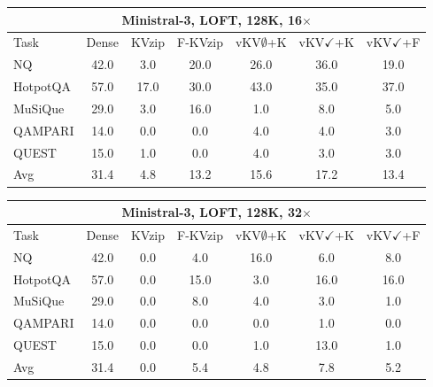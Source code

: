 \begin{tabular}{lcccccc}
\toprule
\multicolumn{7}{c}{Ministral-3, LOFT, 128K, 16$\times$} \\
\midrule
Task & Dense & KVzip & F-KVzip & vKV$\emptyset$+K & vKV$\checkmark$+K & vKV$\checkmark$+F \\
\midrule
NQ & 42.0 & 3.0 & 20.0 & 26.0 & 36.0 & 19.0 \\
HotpotQA & 57.0 & 17.0 & 30.0 & 43.0 & 35.0 & 37.0 \\
MuSiQue & 29.0 & 3.0 & 16.0 & 1.0 & 8.0 & 5.0 \\
QAMPARI & 14.0 & 0.0 & 0.0 & 4.0 & 4.0 & 3.0 \\
QUEST & 15.0 & 1.0 & 0.0 & 4.0 & 3.0 & 3.0 \\
\midrule
Avg & 31.4 & 4.8 & 13.2 & 15.6 & 17.2 & 13.4 \\
\bottomrule
\end{tabular}
\vspace{0.8em}

\begin{tabular}{lcccccc}
\toprule
\multicolumn{7}{c}{Ministral-3, LOFT, 128K, 32$\times$} \\
\midrule
Task & Dense & KVzip & F-KVzip & vKV$\emptyset$+K & vKV$\checkmark$+K & vKV$\checkmark$+F \\
\midrule
NQ & 42.0 & 0.0 & 4.0 & 16.0 & 6.0 & 8.0 \\
HotpotQA & 57.0 & 0.0 & 15.0 & 3.0 & 16.0 & 16.0 \\
MuSiQue & 29.0 & 0.0 & 8.0 & 4.0 & 3.0 & 1.0 \\
QAMPARI & 14.0 & 0.0 & 0.0 & 0.0 & 1.0 & 0.0 \\
QUEST & 15.0 & 0.0 & 0.0 & 1.0 & 13.0 & 1.0 \\
\midrule
Avg & 31.4 & 0.0 & 5.4 & 4.8 & 7.8 & 5.2 \\
\bottomrule
\end{tabular}
\vspace{0.8em}

